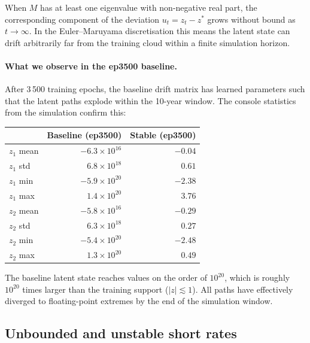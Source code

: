 When $M$ has at least one eigenvalue with non-negative real part, the
corresponding component of the deviation $u_t = z_t - z^*$ grows without bound
as $t \to \infty$.
In the Euler--Maruyama discretisation this means the latent state can drift
arbitrarily far from the training cloud within a finite simulation horizon.

\paragraph{What we observe in the ep3500 baseline.}
After 3\,500 training epochs, the baseline drift matrix has learned parameters
such that the latent paths explode within the 10-year window.
The console statistics from the simulation confirm this:
\begin{center}
\begin{tabular}{lrr}
\toprule
& \textbf{Baseline (ep3500)} & \textbf{Stable (ep3500)} \\
\midrule
$z_1$ mean  & $-6.3 \times 10^{16}$ & $-0.04$ \\
$z_1$ std   & $6.8 \times 10^{18}$  & $0.61$  \\
$z_1$ min   & $-5.9 \times 10^{20}$ & $-2.38$ \\
$z_1$ max   & $\phantom{-}1.4 \times 10^{20}$ & $\phantom{-}3.76$ \\
\midrule
$z_2$ mean  & $-5.8 \times 10^{16}$ & $-0.29$ \\
$z_2$ std   & $6.3 \times 10^{18}$  & $0.27$  \\
$z_2$ min   & $-5.4 \times 10^{20}$ & $-2.48$ \\
$z_2$ max   & $\phantom{-}1.3 \times 10^{20}$ & $\phantom{-}0.49$ \\
\bottomrule
\end{tabular}
\end{center}
The baseline latent state reaches values on the order of $10^{20}$, which is
roughly $10^{20}$ times larger than the training support ($|z| \lesssim 1$).
All paths have effectively diverged to floating-point extremes by the end of the
simulation window.

\subsection{Unbounded and unstable short rates}
\label{subsec:unstable_short_rate}


